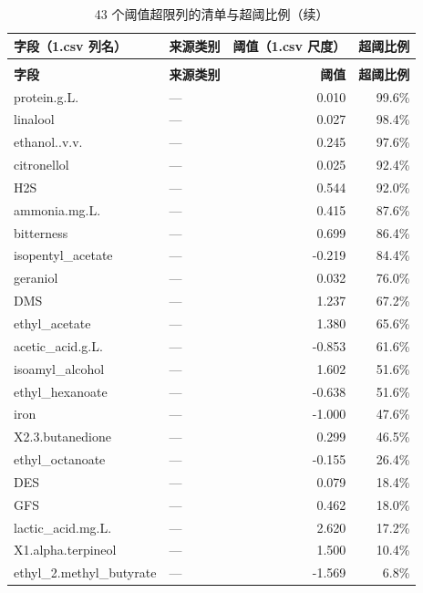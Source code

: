 \begin{longtable}{@{}p{}p{}r r@{}}
\caption{43 个阈值超限列的清单与超阈比例}\\
\toprule
\textbf{字段（1.csv 列名）} & \textbf{来源类别} & \textbf{阈值（1.csv 尺度）} & \textbf{超阈比例} \\
\endfirsthead
\caption*{43 个阈值超限列的清单与超阈比例（续）}\\
\toprule
\textbf{字段} & \textbf{来源类别} & \textbf{阈值} & \textbf{超阈比例} \\
\endhead
\bottomrule
\endlastfoot
protein.\allowbreak{}g.\allowbreak{}L.\allowbreak{} & --- & 0.010 & 99.6\% \\
linalool & --- & 0.027 & 98.4\% \\
ethanol.\allowbreak{}.\allowbreak{}v.\allowbreak{}v.\allowbreak{} & --- & 0.245 & 97.6\% \\
citronellol & --- & 0.025 & 92.4\% \\
H2S & --- & 0.544 & 92.0\% \\
ammonia.\allowbreak{}mg.\allowbreak{}L.\allowbreak{} & --- & 0.415 & 87.6\% \\
bitterness & --- & 0.699 & 86.4\% \\
isopentyl\_acetate & --- & -0.219 & 84.4\% \\
geraniol & --- & 0.032 & 76.0\% \\
DMS & --- & 1.237 & 67.2\% \\
ethyl\_acetate & --- & 1.380 & 65.6\% \\
acetic\_acid.\allowbreak{}g.\allowbreak{}L.\allowbreak{} & --- & -0.853 & 61.6\% \\
isoamyl\_alcohol & --- & 1.602 & 51.6\% \\
ethyl\_hexanoate & --- & -0.638 & 51.6\% \\
iron & --- & -1.000 & 47.6\% \\
X2.\allowbreak{}3.\allowbreak{}butanedione & --- & 0.299 & 46.5\% \\
ethyl\_octanoate & --- & -0.155 & 26.4\% \\
DES & --- & 0.079 & 18.4\% \\
GFS & --- & 0.462 & 18.0\% \\
lactic\_acid.\allowbreak{}mg.\allowbreak{}L.\allowbreak{} & --- & 2.620 & 17.2\% \\
X1.\allowbreak{}alpha.\allowbreak{}terpineol & --- & 1.500 & 10.4\% \\
ethyl\_2.\allowbreak{}methyl\_butyrate & --- & -1.569 & 6.8\% \\

\end{longtable}
